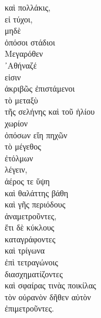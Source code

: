 

{\large
\begin{greek}
\noindent καὶ πολλάκις, \\
εἰ τύχοι, \\
μηδὲ \\
\tabto{2em} ὁπόσοι στάδιοι \\
\tabto{4em} Μεγαρόθεν \\
\tabto{4em} ᾿Αθήναζέ \\
\tabto{2em} εἰσιν \\
ἀκριβῶς ἐπιστάμενοι \\
τὸ μεταξὺ \\
\tabto{2em} τῆς σελήνης καὶ τοῦ ἡλίου \\
χωρίον \\
\tabto{2em} ὁπόσων εἴη πηχῶν \\
\tabto{2em} τὸ μέγεθος \\
ἐτόλμων \\
\tabto{2em} λέγειν, \\
ἀέρος τε ὕψη \\
καὶ θαλάττης βάθη \\
καὶ γῆς περιόδους \\
\tabto{2em} ἀναμετροῦντες, \\
ἔτι δὲ κύκλους \\
\tabto{2em} καταγράφοντες \\
καὶ τρίγωνα \\
\tabto{2em} ἐπὶ τετραγώνοις \\
\tabto{2em} διασχηματίζοντες \\
καὶ σφαίρας τινὰς ποικίλας \\
\tabto{2em} τὸν οὐρανὸν δῆθεν αὐτὸν \\
\tabto{2em} ἐπιμετροῦντες.\\

\end{greek}
}

